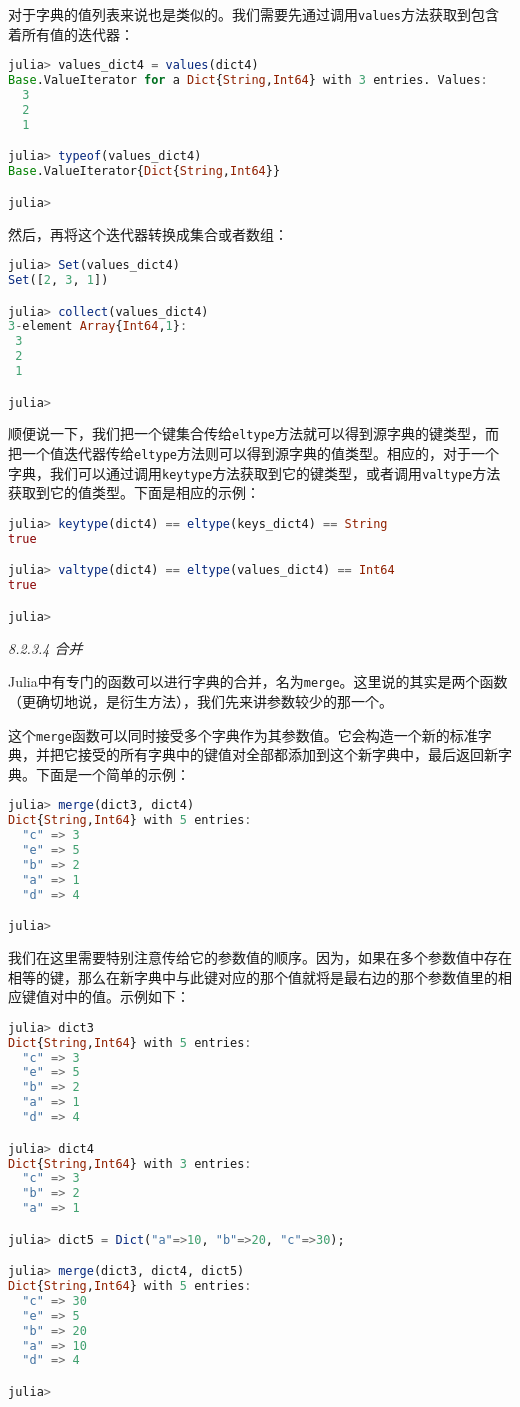 对于字典的值列表来说也是类似的。我们需要先通过调用\verb`values`方法获取到包含着所有值的迭代器：
\begin{lstlisting}[language=julia]
julia> values_dict4 = values(dict4)
Base.ValueIterator for a Dict{String,Int64} with 3 entries. Values:
  3
  2
  1

julia> typeof(values_dict4)
Base.ValueIterator{Dict{String,Int64}}

julia> 
\end{lstlisting}

然后，再将这个迭代器转换成集合或者数组：
\begin{lstlisting}[language=julia]
julia> Set(values_dict4)
Set([2, 3, 1])

julia> collect(values_dict4)
3-element Array{Int64,1}:
 3
 2
 1

julia>
\end{lstlisting}

顺便说一下，我们把一个键集合传给\verb`eltype`方法就可以得到源字典的键类型，而把一个值迭代器传给\verb`eltype`方法则可以得到源字典的值类型。相应的，对于一个字典，我们可以通过调用\verb`keytype`方法获取到它的键类型，或者调用\verb`valtype`方法获取到它的值类型。下面是相应的示例：
\begin{lstlisting}[language=julia]
julia> keytype(dict4) == eltype(keys_dict4) == String
true

julia> valtype(dict4) == eltype(values_dict4) == Int64
true

julia> 
\end{lstlisting}

\textsl{8.2.3.4 合并}

Julia中有专门的函数可以进行字典的合并，名为\verb`merge`。这里说的其实是两个函数（更确切地说，是衍生方法），我们先来讲参数较少的那一个。

这个\verb`merge`函数可以同时接受多个字典作为其参数值。它会构造一个新的标准字典，并把它接受的所有字典中的键值对全部都添加到这个新字典中，最后返回新字典。下面是一个简单的示例：
\begin{lstlisting}[language=julia]
julia> merge(dict3, dict4)
Dict{String,Int64} with 5 entries:
  "c" => 3
  "e" => 5
  "b" => 2
  "a" => 1
  "d" => 4

julia> 
\end{lstlisting}

我们在这里需要特别注意传给它的参数值的顺序。因为，如果在多个参数值中存在相等的键，那么在新字典中与此键对应的那个值就将是最右边的那个参数值里的相应键值对中的值。示例如下：
\begin{lstlisting}[language=julia]
julia> dict3
Dict{String,Int64} with 5 entries:
  "c" => 3
  "e" => 5
  "b" => 2
  "a" => 1
  "d" => 4

julia> dict4
Dict{String,Int64} with 3 entries:
  "c" => 3
  "b" => 2
  "a" => 1

julia> dict5 = Dict("a"=>10, "b"=>20, "c"=>30);

julia> merge(dict3, dict4, dict5)
Dict{String,Int64} with 5 entries:
  "c" => 30
  "e" => 5
  "b" => 20
  "a" => 10
  "d" => 4

julia> 
\end{lstlisting}

